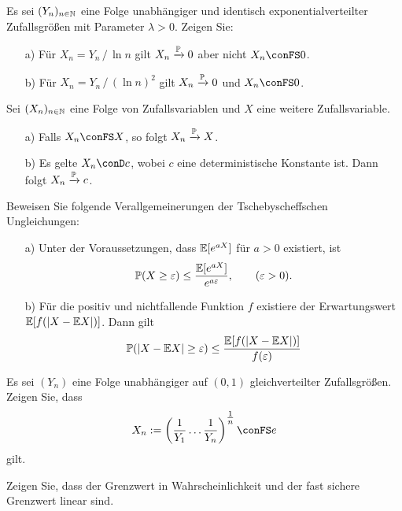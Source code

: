 \begin{aufgabe}
Es sei $(Y_n)_{n\in\mathbb N}$ eine Folge unabhängiger und identisch exponentialverteilter Zufallsgrößen
mit Parameter $\lambda>0$. Zeigen Sie:
\begin{enumerate}
    \item[a)] Für $X_n=Y_n\,/\,\ln n$ gilt $X_n\xrightarrow{\mathbb P} 0$ aber nicht $X_n \conFS 0$. 
    \item[b)] Für $X_n=Y_n\,/\,(\ln n)^2$ gilt $X_n\xrightarrow{\mathbb P} 0$ und $X_n \conFS 0$. 
\end{enumerate}
\end{aufgabe}

\begin{aufgabe} 
Sei $(X_n)_{n\in\mathbb N}$ eine Folge von Zufallsvariablen und $X$ eine weitere Zufallsvariable. 
\begin{enumerate}
    \item[a)] Falls $X_n\conFS X$, so folgt $X_n\xrightarrow{\mathbb P} X$.
    \item[b)] Es gelte $X_n\conD c$, wobei $c$ eine deterministische Konstante ist. Dann folgt $X_n\xrightarrow{\mathbb P} c$. 
\end{enumerate}
\end{aufgabe}

\begin{aufgabe} 
Beweisen Sie folgende Verallgemeinerungen der Tschebyscheffschen Ungleichungen:
\begin{enumerate}
    \item[a)] Unter der Voraussetzungen, dass $\mathbb E[e^{aX}]$ für $a>0$ existiert, ist
    \[
        \mathbb P(X\geq \varepsilon) \leq \dfrac{\mathbb E[e^{aX}]}{e^{a\varepsilon}}, \qquad (\varepsilon>0).
    \]
    \item[b)] Für die positiv und nichtfallende Funktion $f$ existiere der Erwartungswert $\mathbb E[f(|X-\mathbb E X|)]$. Dann gilt
    \[
        \mathbb P(|X-\mathbb E X|\geq \varepsilon) \leq \dfrac{\mathbb E[f(|X-\mathbb E X|)]}{f(\varepsilon)}
    \]
\end{enumerate}
\end{aufgabe}

\begin{aufgabe} 
Es sei $(Y_n)$ eine Folge unabhängiger auf $(0,1)$ gleichverteilter Zufallsgrößen. Zeigen Sie, dass 
\[
    X_n := \left(\dfrac{1}{Y_1}\dots\dfrac{1}{Y_n}\right)^{\tfrac{1}{n}}\conFS e
\]
gilt.
\end{aufgabe}

\begin{aufgabe} 
Zeigen Sie, dass der Grenzwert in Wahrscheinlichkeit und der fast sichere Grenzwert linear sind.
\end{aufgabe}

